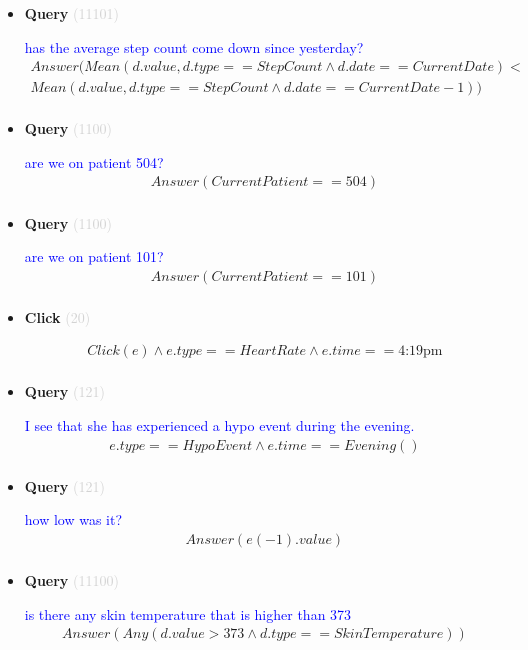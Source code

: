 \documentclass[11pt]{article}
\newcommand{\key}[1]{\textcolor{lightgray}{#1}}
\newcounter{CQuery}
\newcounter{CClick}
\begin{document}
\begin{itemize}
\item
\textbf{Query\theCQuery} \key{(11101)} \addtocounter{CQuery}{1}
\textcolor{blue}{ has the average step count come down since yesterday? }
\begin{multline*}
Answer(Mean(d.value, d.type==StepCount \wedge d.date==CurrentDate) < \\ 
Mean(d.value, d.type==StepCount \wedge d.date==CurrentDate-1)) \\ 
\end{multline*}


\item
\textbf{Query\theCQuery} \key{(1100)} \addtocounter{CQuery}{1}
\textcolor{blue}{ are we on patient 504? }
\begin{multline*}
Answer(CurrentPatient==504) \\ 
\end{multline*}


\item
\textbf{Query\theCQuery} \key{(1100)} \addtocounter{CQuery}{1}
\textcolor{blue}{ are we on patient 101? }
\begin{multline*}
Answer(CurrentPatient==101) \\ 
\end{multline*}


\item
\textbf{Click\theCClick} \key{(20)} \addtocounter{CClick}{1}
\textcolor{blue}{  }
\begin{multline*}
Click(e) \wedge e.type==HeartRate \wedge e.time==\mbox{4:19pm} \\ 
\end{multline*}


\item
\textbf{Query\theCQuery} \key{(121)} \addtocounter{CQuery}{1}
\textcolor{blue}{ I see that she has experienced a hypo event during the evening. }
\begin{multline*}
e.type==HypoEvent \wedge e.time==Evening() \\ 
\end{multline*}


\item
\textbf{Query\theCQuery} \key{(121)} \addtocounter{CQuery}{1}
\textcolor{blue}{ how low was it? }
\begin{multline*}
Answer(e(-1).value) \\ 
\end{multline*}


\item
\textbf{Query\theCQuery} \key{(11100)} \addtocounter{CQuery}{1}
\textcolor{blue}{ is there any skin temperature that is higher than 373 }
\begin{multline*}
Answer(Any(d.value>373 \wedge d.type==SkinTemperature)) \\ 
\end{multline*}



\end{itemize}
\end{document}
